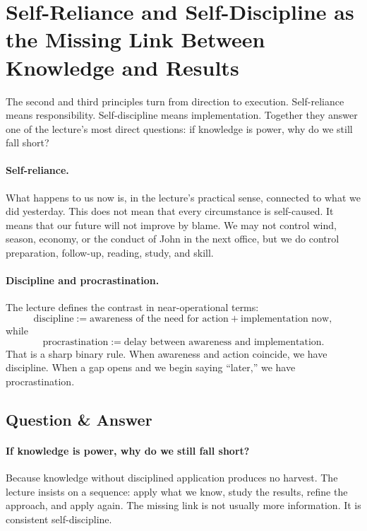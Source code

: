\section{Self-Reliance and Self-Discipline as the Missing Link Between Knowledge and Results}

The second and third principles turn from direction to execution. Self-reliance means responsibility. Self-discipline means implementation. Together they answer one of the lecture's most direct questions: if knowledge is power, why do we still fall short?

\paragraph{Self-reliance.}
What happens to us now is, in the lecture's practical sense, connected to what we did yesterday. This does not mean that every circumstance is self-caused. It means that our future will not improve by blame. We may not control wind, season, economy, or the conduct of John in the next office, but we do control preparation, follow-up, reading, study, and skill.

\paragraph{Discipline and procrastination.}
The lecture defines the contrast in near-operational terms:
\begin{equation}
\text{discipline} := \text{awareness of the need for action} + \text{implementation now},
\end{equation}
while
\begin{equation}
\text{procrastination} := \text{delay between awareness and implementation}.
\end{equation}
That is a sharp binary rule. When awareness and action coincide, we have discipline. When a gap opens and we begin saying ``later,'' we have procrastination.

\subsection{Question \& Answer}

\paragraph{If knowledge is power, why do we still fall short?}
Because knowledge without disciplined application produces no harvest. The lecture insists on a sequence: apply what we know, study the results, refine the approach, and apply again. The missing link is not usually more information. It is consistent self-discipline.

